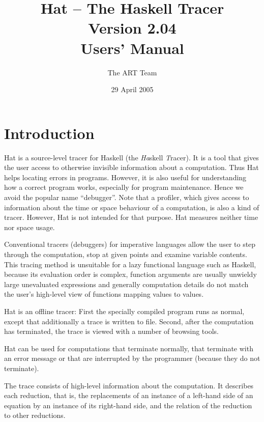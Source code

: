 \documentclass[12pt]{article}
\begin{document}
\title{{\Huge{}Hat -- The Haskell Tracer}\\Version 2.04\\Users' Manual}
\author{The ART Team}
\date{29 April 2005}
\maketitle
\vspace{-6ex}

\thispagestyle{empty}

\tableofcontents


\newpage
\section{Introduction}\label{introduction}

Hat is a source-level tracer for Haskell (the \emph{Ha}skell
\emph{T}racer). It is a tool that gives the user access to otherwise
invisible information about a computation. Thus Hat helps locating
errors in programs. However, it is also useful for understanding how
a correct program works, especially for program maintenance. Hence
we avoid the popular name ``debugger''. Note that a profiler, which
gives access to information about the time or space behaviour of a
computation, is also a kind of tracer. However, Hat is not intended
for that purpose. Hat measures neither time nor space usage.

Conventional tracers (debuggers) for imperative languages allow
the user to step through the computation, stop at given points and
examine variable contents.  This tracing method is unsuitable for a
lazy functional language such as Haskell, because its evaluation order
is complex, function arguments are usually unwieldy large unevaluated
expressions and generally computation details do not match the user's
high-level view of functions mapping values to values.

Hat is an offline tracer: First the specially compiled program runs as
normal, except that additionally a trace is written to file. Second,
after the computation has terminated, the trace is viewed with a
number of browsing tools.

Hat can be used for computations that terminate normally, that
terminate with an error message or that are interrupted by the
programmer (because they do not terminate).

The trace consists of high-level information about the computation. It
describes each reduction, that is, the replacements of an instance
of a left-hand side of an equation by an instance of its right-hand
side, and the relation of the reduction to other reductions.
\end{document}
